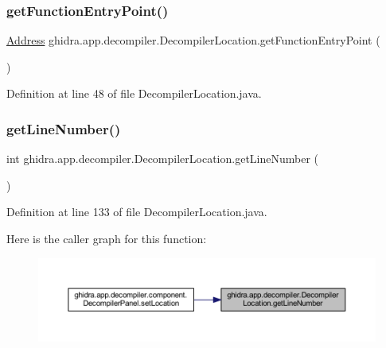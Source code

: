\subsubsection{\texorpdfstring{getFunctionEntryPoint()}{getFunctionEntryPoint()}}
{\footnotesize\ttfamily \mbox{\hyperlink{class_address}{Address}} ghidra.\+app.\+decompiler.\+Decompiler\+Location.\+get\+Function\+Entry\+Point (\begin{DoxyParamCaption}{ }\end{DoxyParamCaption})\hspace{0.3cm}{\ttfamily [inline]}}



Definition at line 48 of file Decompiler\+Location.\+java.

\mbox{\label{classghidra_1_1app_1_1decompiler_1_1_decompiler_location_ae891ed0069c57e51fc74ac3a78491e85}} 
\subsubsection{\texorpdfstring{getLineNumber()}{getLineNumber()}}
{\footnotesize\ttfamily int ghidra.\+app.\+decompiler.\+Decompiler\+Location.\+get\+Line\+Number (\begin{DoxyParamCaption}{ }\end{DoxyParamCaption})\hspace{0.3cm}{\ttfamily [inline]}}



Definition at line 133 of file Decompiler\+Location.\+java.

Here is the caller graph for this function\+:
\nopagebreak
\begin{figure}[H]
\begin{center}
\leavevmode
\includegraphics[width=350pt]{classghidra_1_1app_1_1decompiler_1_1_decompiler_location_ae891ed0069c57e51fc74ac3a78491e85_icgraph}
\end{center}
\end{figure}
\mbox{\label{classghidra_1_1app_1_1decompiler_1_1_decompiler_location_af442b0653d6dcdaa6e706c3f69da6b04}} 

